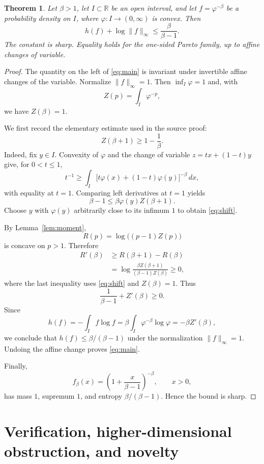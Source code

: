 \documentclass[11pt]{article}
\newtheorem{theorem}{Theorem}
\newcommand{\R}{\mathbb R}
\begin{document}
\begin{theorem}\label{thm:main}
Let $\beta>1$, let $I\subset\R$ be an open interval, and let
$f=\varphi^{-\beta}$ be a probability density on $I$, where
$\varphi:I\to(0,\infty)$ is convex. Then
\begin{equation}\label{eq:main}
 h(f)+\log\|f\|_\infty\leq\frac{\beta}{\beta-1}.
\end{equation}
The constant is sharp. Equality holds for the one-sided Pareto family, up to
affine changes of variable.
\end{theorem}

\begin{proof}
The quantity on the left of \eqref{eq:main} is invariant under invertible
affine changes of the variable. Normalize $\|f\|_\infty=1$. Then
$\inf_I\varphi=1$ and, with
\[
 Z(p)=\int_I\varphi^{-p},
\]
we have $Z(\beta)=1$.

We first record the elementary estimate used in the source proof:
\begin{equation}\label{eq:shift}
 Z(\beta+1)\geq1-\frac1\beta.
\end{equation}
Indeed, fix $y\in I$. Convexity of $\varphi$ and the change of variable
$z=tx+(1-t)y$ give, for $0<t\leq1$,
\[
 t^{-1}
 \geq\int_I\bigl[t\varphi(x)+(1-t)\varphi(y)\bigr]^{-\beta}\,dx,
\]
with equality at $t=1$. Comparing left derivatives at $t=1$ yields
\[
 \beta-1\leq\beta\varphi(y)Z(\beta+1).
\]
Choose $y$ with $\varphi(y)$ arbitrarily close to its infimum $1$ to obtain
\eqref{eq:shift}.

By Lemma~\ref{lem:moment},
\[
 R(p)=\log\bigl((p-1)Z(p)\bigr)
\]
is concave on $p>1$. Therefore
\begin{align*}
 R'(\beta)
 &\geq R(\beta+1)-R(\beta)\\
 &=\log\frac{\beta Z(\beta+1)}{(\beta-1)Z(\beta)}\geq0,
\end{align*}
where the last inequality uses \eqref{eq:shift} and $Z(\beta)=1$. Thus
\[
 \frac1{\beta-1}+Z'(\beta)\geq0.
\]
Since
\[
 h(f)=-\int_I f\log f
     =\beta\int_I\varphi^{-\beta}\log\varphi
     =-\beta Z'(\beta),
\]
we conclude that $h(f)\leq\beta/(\beta-1)$ under the normalization
$\|f\|_\infty=1$. Undoing the affine change proves \eqref{eq:main}.

Finally,
\[
 f_\beta(x)=\left(1+\frac{x}{\beta-1}\right)^{-\beta},
 \qquad x>0,
\]
has mass $1$, supremum $1$, and entropy $\beta/(\beta-1)$. Hence the bound
is sharp.
\end{proof}

\section{Verification, higher-dimensional obstruction, and novelty}
\end{document}
